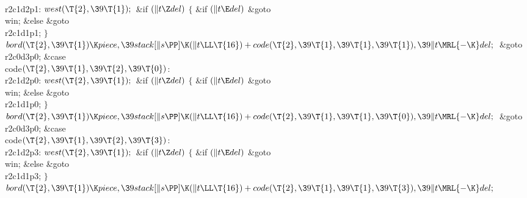 \\{r2c1d2p1}:\5
${}\\{west}(\T{2},\39\T{1});{}$\6
\&{if} ${}(\|t\Z\\{del}){}$\5
${}\{{}$\5
\1\&{if} ${}(\|t\E\\{del}){}$\1\5
\&{goto} \\{win};\5
\2\&{else}\1\5
\&{goto} \\{r2c1d1p1};\5
\2${}\}{}$\2\6
${}\\{bord}(\T{2},\39\T{1})\K\\{piece},\39\\{stack}[\|s\PP]\K(\|t\LL\T{16})+%
\\{code}(\T{2},\39\T{1},\39\T{1},\39\T{1}),\39\|t\MRL{-{\K}}\\{del};{}$\6
\&{goto} \\{r2c0d3p0};\6
\4\&{case} \\{code}${}(\T{2},\39\T{1},\39\T{2},\39\T{0}){}$:\5
\\{r2c1d2p0}:\5
${}\\{west}(\T{2},\39\T{1});{}$\6
\&{if} ${}(\|t\Z\\{del}){}$\5
${}\{{}$\5
\1\&{if} ${}(\|t\E\\{del}){}$\1\5
\&{goto} \\{win};\5
\2\&{else}\1\5
\&{goto} \\{r2c1d1p0};\5
\2${}\}{}$\2\6
${}\\{bord}(\T{2},\39\T{1})\K\\{piece},\39\\{stack}[\|s\PP]\K(\|t\LL\T{16})+%
\\{code}(\T{2},\39\T{1},\39\T{1},\39\T{0}),\39\|t\MRL{-{\K}}\\{del};{}$\6
\&{goto} \\{r2c0d3p0};\6
\4\&{case} \\{code}${}(\T{2},\39\T{1},\39\T{2},\39\T{3}){}$:\5
\\{r2c1d2p3}:\5
${}\\{west}(\T{2},\39\T{1});{}$\6
\&{if} ${}(\|t\Z\\{del}){}$\5
${}\{{}$\5
\1\&{if} ${}(\|t\E\\{del}){}$\1\5
\&{goto} \\{win};\5
\2\&{else}\1\5
\&{goto} \\{r2c1d1p3};\5
\2${}\}{}$\2\6
${}\\{bord}(\T{2},\39\T{1})\K\\{piece},\39\\{stack}[\|s\PP]\K(\|t\LL\T{16})+%
\\{code}(\T{2},\39\T{1},\39\T{1},\39\T{3}),\39\|t\MRL{-{\K}}\\{del};{}$\6

